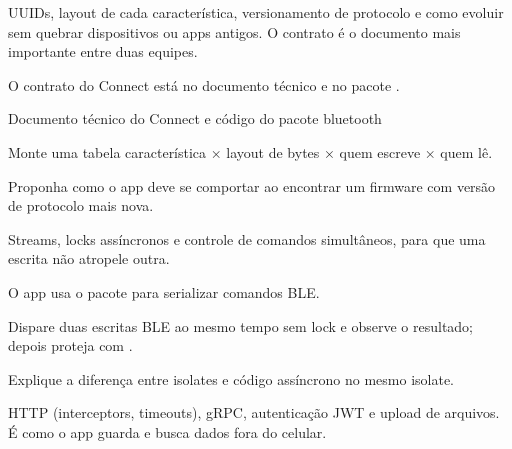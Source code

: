 UUIDs, layout de cada característica, versionamento de protocolo e como evoluir sem quebrar dispositivos ou apps antigos. O contrato é o documento mais importante entre duas equipes.

\begin{noproduto}
O contrato do Connect está no documento técnico e no pacote .
\end{noproduto}

\begin{paraestudar}
  \item Documento técnico do Connect e código do pacote bluetooth
\end{paraestudar}

\begin{pratique}
  \item Monte uma tabela característica × layout de bytes × quem escreve × quem lê.
  \item Proponha como o app deve se comportar ao encontrar um firmware com versão de protocolo mais nova.
\end{pratique}

Streams, locks assíncronos e controle de comandos simultâneos, para que uma escrita não atropele outra.

\begin{noproduto}
O app usa o pacote  para serializar comandos BLE.
\end{noproduto}

\begin{paraestudar}
  \item {}
  \item {}
\end{paraestudar}

\begin{pratique}
  \item Dispare duas escritas BLE ao mesmo tempo sem lock e observe o resultado; depois proteja com .
  \item Explique a diferença entre isolates e código assíncrono no mesmo isolate.
\end{pratique}

HTTP (interceptors, timeouts), gRPC, autenticação JWT e upload de arquivos. É como o app guarda e busca dados fora do celular.

